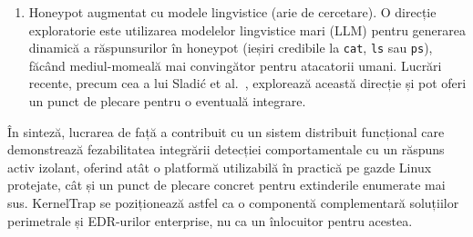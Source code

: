 \documentclass[12pt, a4paper]{report}
\begin{document}
\begin{enumerate}
  \item Honeypot augmentat cu modele lingvistice (arie de cercetare).
    O direcție exploratorie este utilizarea modelelor lingvistice mari (LLM)
    pentru generarea dinamică a răspunsurilor în honeypot (ieșiri credibile
    la \texttt{cat}, \texttt{ls} sau \texttt{ps}), făcând mediul-momeală
    mai convingător pentru atacatorii umani. Lucrări recente, precum cea
    a lui Sladić et al.~\cite{sladic2024llm}, explorează această direcție și
    pot oferi un punct de plecare pentru o eventuală integrare.
\end{enumerate}

În sinteză, lucrarea de față a contribuit cu un sistem distribuit funcțional
care demonstrează fezabilitatea integrării detecției comportamentale cu un
răspuns activ izolant, oferind atât o platformă utilizabilă în practică pe
gazde Linux protejate, cât și un punct de plecare concret pentru extinderile
enumerate mai sus. KernelTrap se poziționează astfel ca o componentă
complementară soluțiilor perimetrale și EDR-urilor enterprise, nu ca un
înlocuitor pentru acestea.



\end{document}

